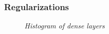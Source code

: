 \documentclass[14pt]{beamer}
\begin{document}
		
		\begin{frame}
			\frametitle{Regularizations}
			\begin{figure}[ht]
				\caption{\textit{Histogram of dense layers} }
				\begin{minipage}[ht]{1\linewidth}
				\end{minipage}
				\hfill
				\begin{minipage}[ht]{1\linewidth}
				\end{minipage}
			\end{figure}
		\end{frame}
		
\end{document}
